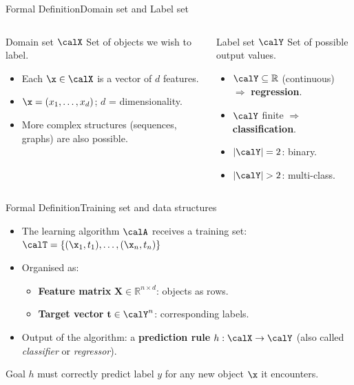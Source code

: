 \begin{frame}{Formal Definition}{Domain set and Label set}
  \begin{columns}[T]
    \begin{block}{Domain set $\calX$}
      Set of objects we wish to label.
      \begin{itemize}
        \item Each $\x \in \calX$ is a vector of $d$ features.
        \item $\x = (x_1, \ldots, x_d)$;\; $d$ = dimensionality.
        \item More complex structures (sequences, graphs) are also possible.
      \end{itemize}
    \end{block}
    \begin{block}{Label set $\calY$}
      Set of possible output values.
      \begin{itemize}
        \item $\calY \subseteq \mathbb{R}$ (continuous) $\Rightarrow$ \textbf{regression}.
        \item $\calY$ finite $\Rightarrow$ \textbf{classification}.
        \item $|\calY|=2$: binary.
        \item $|\calY|>2$: multi-class.
      \end{itemize}
    \end{block}
  \end{columns}
\end{frame}

\begin{frame}{Formal Definition}{Training set and data structures}
  \begin{itemize}
    \item The learning algorithm $\calA$ receives a training set:
          $\calT = \{(\x_1, t_1), \ldots, (\x_n, t_n)\}$
    \item Organised as:
      \begin{itemize}
        \item \textcolor{AccentBlue}{\textbf{Feature matrix}} $\mathbf{X} \in \mathbb{R}^{n\times d}$:
              objects as rows.
        \item \textcolor{AccentBlue}{\textbf{Target vector}} $\mathbf{t} \in \calY^n$:
              corresponding labels.
      \end{itemize}
    \item Output of the algorithm: a
          \textcolor{AccentBlue}{\textbf{prediction rule}} $h : \calX \to \calY$
          (also called \emph{classifier} or \emph{regressor}).
  \end{itemize}
  \bigskip
  \begin{block}{Goal}
    $h$ must correctly predict label $y$ for any new object $\x$ it encounters.
  \end{block}
\end{frame}

